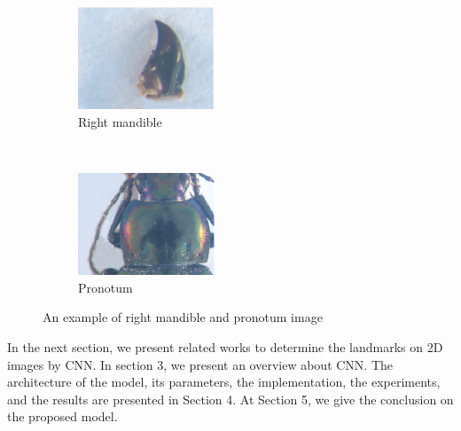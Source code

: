 \documentclass[conference]{IEEEtran}
\begin{document}
\begin{figure}[htbp]
    \centering
    \begin{subfigure}[t]{0.25\textwidth}
        \centering
        \includegraphics[height=1.2in]{images/md19.eps}
        \caption{Right mandible}
        \label{figsub01}
    \end{subfigure}%
    ~ 
    \begin{subfigure}[t]{0.25\textwidth}
        \centering
        \includegraphics[height=1.2in]{images/prono60.eps}
        \caption{Pronotum }
        \label{figsub02}
    \end{subfigure}
    \caption{An example of right mandible and pronotum image}
    \label{figsub012}
\end{figure}

In the next section, we present related works to determine the landmarks on 2D images by CNN. In section 3, we present an overview about CNN. The architecture of the model, its parameters, the implementation, the experiments, and the results are presented in Section 4. At Section 5, we give the conclusion on the proposed model.
\end{document}
